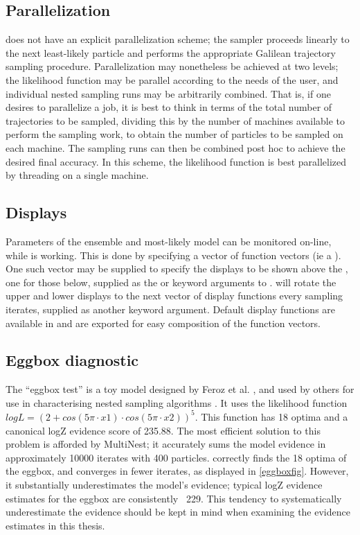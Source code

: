 \subsection{Parallelization}
 does not have an explicit parallelization scheme; the sampler proceeds linearly to the next least-likely particle and performs the appropriate Galilean trajectory sampling procedure. Parallelization may nonetheless be achieved at two levels; the likelihood function may be parallel according to the needs of the user, and individual nested sampling runs may be arbitrarily combined. That is, if one desires to parallelize a  job, it is best to think in terms of the total number of trajectories to be sampled, dividing this by the number of machines available to perform the sampling work, to obtain the number of particles to be sampled on each machine. The sampling runs can then be combined post hoc to achieve the desired final accuracy. In this scheme, the likelihood function is best parallelized by threading on a single machine.

\subsection{Displays}
Parameters of the ensemble and most-likely model can be monitored on-line, while  is working. This is done by specifying a vector of function vectors (ie a ). One such vector may be supplied to specify the displays to be shown above the , one for those below, supplied as the  or  keyword arguments to .  will rotate the upper and lower displays to the next vector of display functions every  sampling iterates, supplied as another  keyword argument. Default display functions are available in  and are exported for easy composition of the function vectors.

\subsection{Eggbox diagnostic}
The ``eggbox test'' is a toy model designed by Feroz et al. \cite{Feroz2009}, and used by others for use in characterising nested sampling algorithms \cite{Buchner2016}. It uses the likelihood function $logL = (2 + cos(5π \cdot x1) \cdot cos(5π \cdot x2))^5$. This function has 18 optima and a canonical logZ evidence score of 235.88. The most efficient solution to this problem is afforded by MultiNest; it accurately sums the model evidence in approximately 10000 iterates with 400 particles.  correctly finds the 18 optima of the eggbox, and converges in fewer iterates, as displayed in \autoref{eggboxfig}. However, it substantially underestimates the model's evidence; typical  logZ evidence estimates for the eggbox are consistently ~229. This tendency to systematically underestimate the evidence should be kept in mind when examining the evidence estimates in this thesis.

